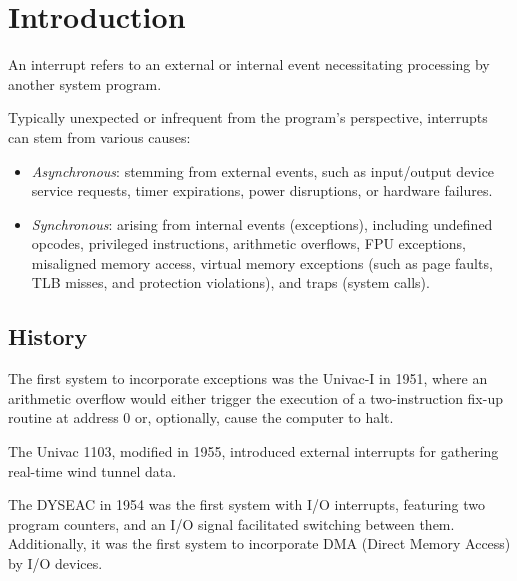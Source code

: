 \section{Introduction}

\begin{definition}
    An interrupt refers to an external or internal event necessitating processing by another system program.
\end{definition}
Typically unexpected or infrequent from the program's perspective, interrupts can stem from various causes:
\begin{itemize}
    \item \textit{Asynchronous}: stemming from external events, such as input/output device service requests, timer expirations, power disruptions, or hardware failures.
    \item \textit{Synchronous}: arising from internal events (exceptions), including undefined opcodes, privileged instructions, arithmetic overflows, FPU exceptions, misaligned memory access, virtual memory exceptions (such as page faults, TLB misses, and protection violations), and traps (system calls).
\end{itemize}

\subsection{History}
The first system to incorporate exceptions was the Univac-I in 1951, where an arithmetic overflow would either trigger the execution of a two-instruction fix-up routine at address 0 or, optionally, cause the computer to halt.

The Univac 1103, modified in 1955, introduced external interrupts for gathering real-time wind tunnel data.

The DYSEAC in 1954 was the first system with I/O interrupts, featuring two program counters, and an I/O signal facilitated switching between them. 
Additionally, it was the first system to incorporate DMA (Direct Memory Access) by I/O devices.